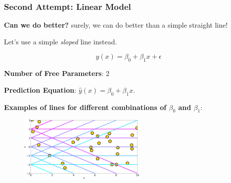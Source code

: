\documentclass{beamer}
\begin{document}
\begin{frame}
\frametitle{Second Attempt: Linear Model}

\textbf{Can we do better?} surely, we can do better than a simple straight line!

Let's use a simple \emph{sloped} line instead.

\[
y(x)=\beta_{0}+\beta_{1}x+\epsilon
\]

\textbf{Number of Free Parameters}: 2

\textbf{Prediction Equation}: $\hat{y}(x) = \beta_0 + \beta_1 x$.

\textbf{Examples of lines for different combinations of $\beta_0$ and $\beta_1$}:

\begin{figure}
\includegraphics[width=0.55\textwidth]{../figures/line_priors.png}
\end{figure}


\end{frame}
\end{document}

